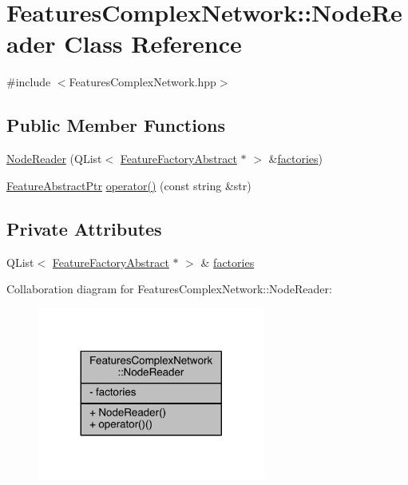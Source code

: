 \hypertarget{class_features_complex_network_1_1_node_reader}{\section{Features\+Complex\+Network\+:\+:Node\+Reader Class Reference}
\label{class_features_complex_network_1_1_node_reader}
}


{\ttfamily \#include $<$Features\+Complex\+Network.\+hpp$>$}

\subsection*{Public Member Functions}
\begin{DoxyCompactItemize}
\item 
\hyperlink{class_features_complex_network_1_1_node_reader_a802901cc6243f8659136c58f8e4caba7}{Node\+Reader} (Q\+List$<$ \hyperlink{class_feature_factory_abstract}{Feature\+Factory\+Abstract} $\ast$ $>$ \&\hyperlink{class_features_complex_network_1_1_node_reader_a488f9f45d6015c0dc00d6a1ff5b04e2a}{factories})
\item 
\hyperlink{class_feature_abstract_ptr}{Feature\+Abstract\+Ptr} \hyperlink{class_features_complex_network_1_1_node_reader_a2d71db12d7b6e13f56ad1c7d665fcd91}{operator()} (const string \&str)
\end{DoxyCompactItemize}
\subsection*{Private Attributes}
\begin{DoxyCompactItemize}
\item 
Q\+List$<$ \hyperlink{class_feature_factory_abstract}{Feature\+Factory\+Abstract} $\ast$ $>$ \& \hyperlink{class_features_complex_network_1_1_node_reader_a488f9f45d6015c0dc00d6a1ff5b04e2a}{factories}
\end{DoxyCompactItemize}


Collaboration diagram for Features\+Complex\+Network\+:\+:Node\+Reader\+:\nopagebreak
\begin{figure}[H]
\begin{center}
\leavevmode
\includegraphics[width=212pt]{class_features_complex_network_1_1_node_reader__coll__graph}
\end{center}
\end{figure}


